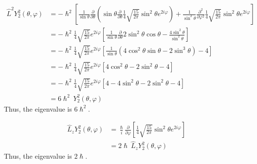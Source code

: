 \documentclass[10pt]{article}
\begin{document}
\begin{enumerate}
    \begin{align*}
      \hat{L}^2 Y_{2}^{2}\left( \theta, \varphi \right) &= - \hslash^2 \left[ \frac{1}{\sin \theta} \frac{\partial }{\partial \theta} \left( \sin \theta \frac{\partial }{\partial \theta} \frac{1}{4} \sqrt{\frac{15}{2\pi}} \sin ^2 \theta e ^ {2i \varphi} \right) + \frac{1}{\sin ^2 \theta} \frac{\partial ^2}{\partial \varphi^2} \frac{1}{4}\sqrt{\frac{15}{2\pi}} \sin ^2 \theta e ^ {2i \varphi}\right] \\
      &= - \hslash^2 \frac{1}{4} \sqrt{\frac{15}{2\pi}} e ^ {2i\varphi}\left[ \frac{1}{\sin \theta} \frac{\partial }{\partial \theta} 2 \sin^2\theta\cos\theta - \frac{4 \sin^2\theta}{\sin ^2 \theta} \right] \\
      &= - \hslash^2 \frac{1}{4} \sqrt{\frac{15}{2\pi}} e ^ {2i\varphi}\left[ \frac{1}{\sin \theta} \left( 4 \cos^2\theta \sin\theta - 2\sin^3\theta \right) - 4 \right] \\
      &= - \hslash^2 \frac{1}{4} \sqrt{\frac{15}{2\pi}} e ^ {2i\varphi}\left[ 4 \cos^2 \theta - 2\sin ^2 \theta - 4 \right] \\
      &= - \hslash^2 \frac{1}{4} \sqrt{\frac{15}{2\pi}} e ^ {2i\varphi}\left[ 4 - 4 \sin^2 \theta - 2\sin ^2 \theta - 4 \right] \\
      &= 6 \hslash^2 ~ Y_2^2 \left( \theta, \varphi \right)
    \end{align*}
    Thus, the eigenvalue is $ 6 \hslash ^2 $.

    \begin{align*}
      \hat{L}_{z} Y_{2}^{2}\left( \theta, \varphi \right) &= \frac{\hslash}{i} \frac{\partial }{\partial \varphi} \left[ \frac{1}{4} \sqrt{\frac{15}{2\pi}} \sin^2 \theta e ^ {2i \varphi}\right] \\
      &= 2\hslash ~ \hat{L}_{z} Y_{2}^{2}\left( \theta, \varphi \right) 
    \end{align*}
    Thus, the eigenvalue is $ 2 \hslash $.
\end{enumerate}
\end{document}
